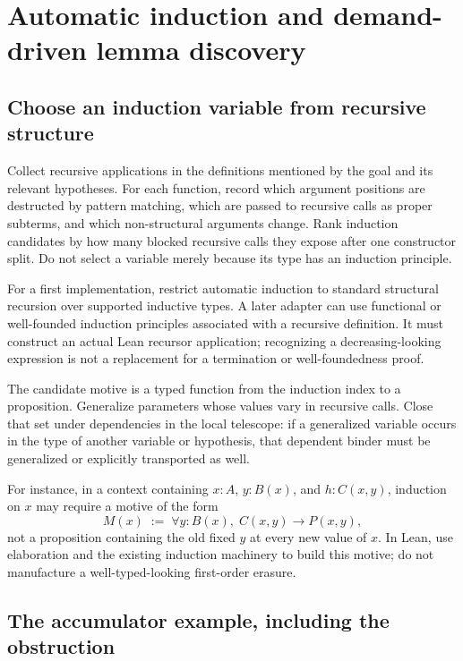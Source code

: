 \section{Automatic induction and demand-driven lemma discovery}

\subsection{Choose an induction variable from recursive structure}

Collect recursive applications in the definitions mentioned by the goal and
its relevant hypotheses. For each function, record which argument positions
are destructed by pattern matching, which are passed to recursive calls as
proper subterms, and which non-structural arguments change. Rank induction
candidates by how many blocked recursive calls they expose after one
constructor split. Do not select a variable merely because its type has an
induction principle.

For a first implementation, restrict automatic induction to standard
structural recursion over supported inductive types. A later adapter can use
functional or well-founded induction principles associated with a recursive
definition. It must construct an actual Lean recursor application; recognizing
a decreasing-looking expression is not a replacement for a termination or
well-foundedness proof.

The candidate motive is a typed function from the induction index to a
proposition. Generalize parameters whose values vary in recursive calls.
Close that set under dependencies in the local telescope: if a generalized
variable occurs in the type of another variable or hypothesis, that dependent
binder must be generalized or explicitly transported as well.

For instance, in a context containing $x:A$, $y:B(x)$, and $h:C(x,y)$,
induction on $x$ may require a motive of the form
\[
M(x)\;:=\;\forall y:B(x),\; C(x,y)\to P(x,y),
\]
not a proposition containing the old fixed $y$ at every new value of $x$.
In Lean, use elaboration and the existing induction machinery to build this
motive; do not manufacture a well-typed-looking first-order erasure.

\subsection{The accumulator example, including the obstruction}

